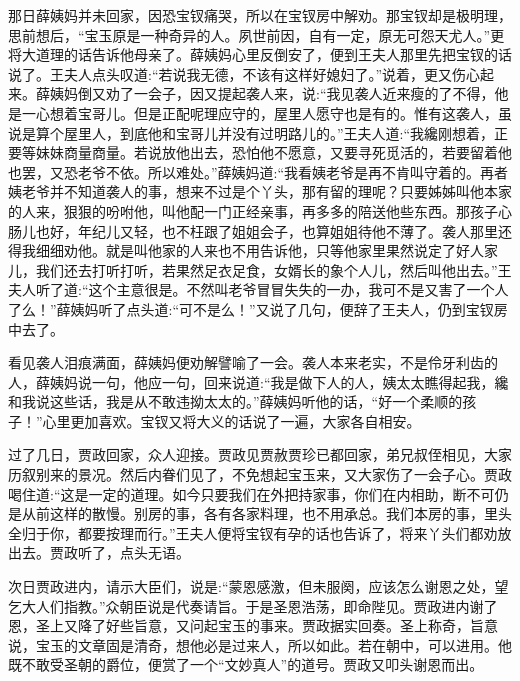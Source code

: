 \begin{parag}
    那日薛姨妈并未回家，因恐宝钗痛哭，所以在宝钗房中解劝。那宝钗却是极明理，思前想后，“宝玉原是一种奇异的人。夙世前因，自有一定，原无可怨天尤人。”更将大道理的话告诉他母亲了。薛姨妈心里反倒安了，便到王夫人那里先把宝钗的话说了。王夫人点头叹道:“若说我无德，不该有这样好媳妇了。”说着，更又伤心起来。薛姨妈倒又劝了一会子，因又提起袭人来，说:“我见袭人近来瘦的了不得，他是一心想着宝哥儿。但是正配呢理应守的，屋里人愿守也是有的。惟有这袭人，虽说是算个屋里人，到底他和宝哥儿并没有过明路儿的。”王夫人道:“我纔刚想着，正要等妹妹商量商量。若说放他出去，恐怕他不愿意，又要寻死觅活的，若要留着他也罢，又恐老爷不依。所以难处。”薛姨妈道:“我看姨老爷是再不肯叫守着的。再者姨老爷并不知道袭人的事，想来不过是个丫头，那有留的理呢？只要姊姊叫他本家的人来，狠狠的吩咐他，叫他配一门正经亲事，再多多的陪送他些东西。那孩子心肠儿也好，年纪儿又轻，也不枉跟了姐姐会子，也算姐姐待他不薄了。袭人那里还得我细细劝他。就是叫他家的人来也不用告诉他，只等他家里果然说定了好人家儿，我们还去打听打听，若果然足衣足食，女婿长的象个人儿，然后叫他出去。”王夫人听了道:“这个主意很是。不然叫老爷冒冒失失的一办，我可不是又害了一个人了么！”薛姨妈听了点头道:“可不是么！”又说了几句，便辞了王夫人，仍到宝钗房中去了。
\end{parag}


\begin{parag}
    看见袭人泪痕满面，薛姨妈便劝解譬喻了一会。袭人本来老实，不是伶牙利齿的人，薛姨妈说一句，他应一句，回来说道:“我是做下人的人，姨太太瞧得起我，纔和我说这些话，我是从不敢违拗太太的。”薛姨妈听他的话，“好一个柔顺的孩子！”心里更加喜欢。宝钗又将大义的话说了一遍，大家各自相安。
\end{parag}


\begin{parag}
    过了几日，贾政回家，众人迎接。贾政见贾赦贾珍已都回家，弟兄叔侄相见，大家历叙别来的景况。然后内眷们见了，不免想起宝玉来，又大家伤了一会子心。贾政喝住道:“这是一定的道理。如今只要我们在外把持家事，你们在内相助，断不可仍是从前这样的散慢。别房的事，各有各家料理，也不用承总。我们本房的事，里头全归于你，都要按理而行。”王夫人便将宝钗有孕的话也告诉了，将来丫头们都劝放出去。贾政听了，点头无语。
\end{parag}


\begin{parag}
    次日贾政进内，请示大臣们，说是:“蒙恩感激，但未服阕，应该怎么谢恩之处，望乞大人们指教。”众朝臣说是代奏请旨。于是圣恩浩荡，即命陛见。贾政进内谢了恩，圣上又降了好些旨意，又问起宝玉的事来。贾政据实回奏。圣上称奇，旨意说，宝玉的文章固是清奇，想他必是过来人，所以如此。若在朝中，可以进用。他既不敢受圣朝的爵位，便赏了一个“文妙真人”的道号。贾政又叩头谢恩而出。
\end{parag}


